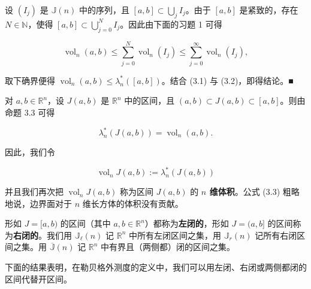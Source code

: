 \begin{proposition}
\begin{subitems}
设 $ (I_j) $ 是 $ \mathbb{J}(n) $ 中的序列，且 $ [a, b] \subset \bigcup_j I_j $。由于 $ [a, b] $ 是紧致的，存在 $ N \in \mathbb{N} $，使得 $ [a, b] \subset \bigcup_{j=0}^{N} I_j $。因此由下面的习题 1 可得

\[
\operatorname{vol}_n(a,b) \le \sum_{j=0}^{N} \operatorname{vol}_n(I_j) \le \sum_{j=0}^{\infty} \operatorname{vol}_n(I_j) ,
\]

取下确界便得 $ \operatorname{vol}_n(a,b) \le \lambda_n^*([a,b]) $。结合 (3.1) 与 (3.2)，即得结论。\nobreak\hspace{0.35em}■

\end{subitems}

\end{proposition}

对 $ a, b \in \mathbb{R}^n $，设 $ J(a,b) $ 是 $ \mathbb{R}^n $ 中的区间，且 $ (a, b) \subset J(a,b) \subset [a, b] $。则由命题 3.3 可得

\begin{equation}
\lambda_n^*(J(a,b)) = \operatorname{vol}_n(a,b) .\tag{3.3}
\end{equation}

因此，我们令

\[
\operatorname{vol}_n J(a,b) := \lambda_n^*(J(a,b))
\]

并且我们再次把 $ \operatorname{vol}_n J(a,b) $ 称为区间 $ J(a,b) $ 的 \textbf{$ n $ 维体积}。公式 (3.3) 粗略地说，边界面对于 $ n $ 维长方体的体积没有贡献。

形如 $ J = [a, b) $ 的区间（其中 $ a, b \in \mathbb{R}^n $）都称为\textbf{左闭的}，形如 $ J = (a, b] $ 的区间称为\textbf{右闭的}。我们用 $ \mathbb{J}_\ell(n) $ 记 $ \mathbb{R}^n $ 中所有左闭区间之集，用 $ \mathbb{J}_r(n) $ 记所有右闭区间之集。用 $ \overline{\mathbb{J}}(n) $ 记 $ \mathbb{R}^n $ 中有界且（两侧都）闭的区间之集。

下面的结果表明，在勒贝格外测度的定义中，我们可以用左闭、右闭或两侧都闭的区间代替开区间。

